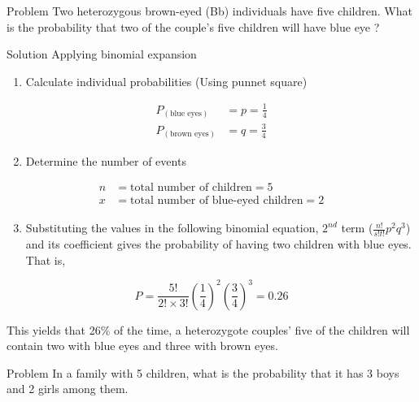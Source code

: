 \documentclass[11pt,ignorenonframetext,aspectratio=169]{beamer}
\providecommand{\tightlist}{%
  \setlength{\itemsep}{0pt}\setlength{\parskip}{0pt}}
\begin{document}
\begin{frame}{Problem}
\protect\hypertarget{problem-3}{}
Two heterozygous brown-eyed (Bb) individuals have five children. What is
the probability that two of the couple's five children will have blue
eye ?
\end{frame}

\begin{frame}{Solution}
\protect\hypertarget{solution-1}{}
Applying binomial expansion

\begin{enumerate}
\tightlist
\item
  Calculate individual probabilities (Using punnet square)
\end{enumerate}

\[
\begin{aligned}
P_{(\text{blue eyes})} &= p = \frac{1}{4} \\
P_{(\text{brown eyes})} &= q = \frac{3}{4}
\end{aligned}
\]

\begin{enumerate}
\setcounter{enumi}{1}
\tightlist
\item
  Determine the number of events
\end{enumerate}

\[
\begin{aligned}
n &= \text{total number of children} = 5 \\
x &= \text{total number of blue-eyed children} = 2
\end{aligned}
\]

\begin{enumerate}
\setcounter{enumi}{2}
\tightlist
\item
  Substituting the values in the following binomial equation, \(2^{nd}\)
  term (\(\frac{n!}{s! t!} p^2 q^3\)) and its coefficient gives the
  probability of having two children with blue eyes. That is,
\end{enumerate}

\[
P = \frac{5!}{2! \times 3!} \left(\frac{1}{4}\right)^2 \left(\frac{3}{4}\right)^3 = 0.26
\]

This yields that 26\% of the time, a heterozygote couples' five of the
children will contain two with blue eyes and three with brown eyes.
\end{frame}

\begin{frame}{Problem}
\protect\hypertarget{problem-4}{}
In a family with 5 children, what is the probability that it has 3 boys
and 2 girls among them.
\end{frame}
\end{document}
